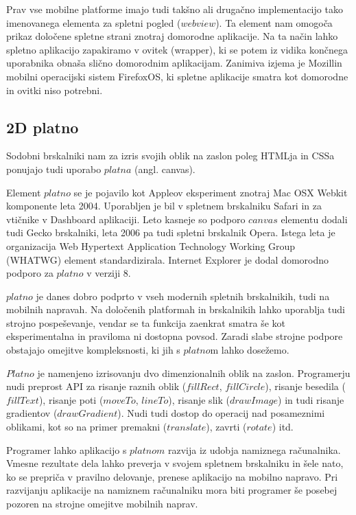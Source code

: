 Prav vse mobilne platforme imajo tudi takšno ali drugačno implementacijo tako imenovanega elementa za spletni pogled ($webview$). Ta element nam omogoča prikaz določene spletne strani znotraj domorodne aplikacije. Na ta način lahko spletno aplikacijo zapakiramo v ovitek (wrapper), ki se potem iz vidika končnega uporabnika obnaša slično domorodnim aplikacijam. Zanimiva izjema je Mozillin mobilni operacijski sistem FirefoxOS, ki spletne aplikacije smatra kot domorodne in ovitki niso potrebni.

\subsection{2D platno}

Sodobni brskalniki nam za izris svojih oblik na zaslon poleg HTMLja in CSSa ponujajo tudi uporabo $platna$ (angl. canvas). 

Element $platno$ se je pojavilo kot Appleov eksperiment znotraj Mac OSX Webkit komponente leta 2004. Uporabljen je bil v spletnem brskalniku Safari in za vtičnike v Dashboard aplikaciji. Leto kasneje so podporo $canvas$ elementu dodali tudi Gecko brskalniki, leta 2006 pa tudi spletni brskalnik Opera. Istega leta je organizacija Web Hypertext Application Technology Working Group (WHATWG) element standardizirala. Internet Explorer je dodal domorodno podporo za $platno$ v verziji 8.

$platno$ je danes dobro podprto v vseh modernih spletnih brskalnikih, tudi na mobilnih napravah. Na določenih platformah in brskalnikih lahko uporablja tudi strojno pospeševanje, vendar se ta funkcija zaenkrat smatra še kot eksperimentalna in praviloma ni dostopna povsod. Zaradi slabe strojne podpore obstajajo omejitve kompleksnosti, ki jih s $platno$m lahko dosežemo.


$Platno$ je namenjeno izrisovanju dvo dimenzionalnih oblik na zaslon. Programerju nudi preprost API za risanje raznih oblik ($fillRect$, $fillCircle$), risanje besedila ($fillText$), risanje poti ($moveTo$, $lineTo$), risanje slik ($drawImage$) in tudi risanje gradientov ($drawGradient$). Nudi tudi dostop do operacij nad posameznimi oblikami, kot so na primer premakni ($translate$), zavrti ($rotate$) itd. 

Programer lahko aplikacijo s $platnom$ razvija iz udobja namiznega računalnika. Vmesne rezultate dela lahko preverja v svojem spletnem brskalniku in šele nato, ko se prepriča v pravilno delovanje, prenese aplikacijo na mobilno napravo. Pri razvijanju aplikacije na namiznem računalniku mora biti programer še posebej pozoren na strojne omejitve mobilnih naprav. 

